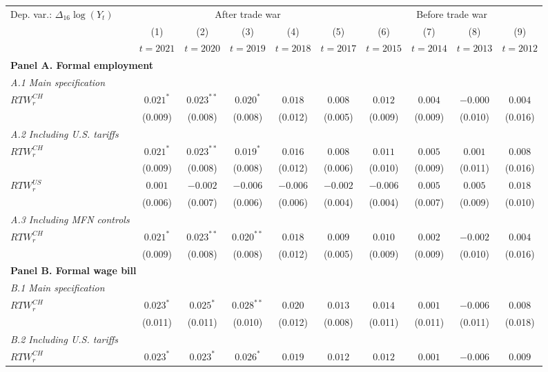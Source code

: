 \begin{tabular}{l*{9}{c}}
\toprule
Dep. var.: $\Delta_{16}\log(Y_t)$ & \multicolumn{5}{c}{After trade war} & \multicolumn{4}{c}{Before trade war} \\
\cmidrule(lr){2-6}\cmidrule(lr){7-10}
 & (1) & (2) & (3) & (4) & (5) & (6) & (7) & (8) & (9) \\
 & $t=2021$ & $t=2020$ & $t=2019$ & $t=2018$ & $t=2017$ & $t=2015$ & $t=2014$ & $t=2013$ & $t=2012$ \\
\midrule
\multicolumn{10}{l}{\textbf{Panel A. Formal employment}} \\
\textit{A.1 Main specification} \\
$RTW_r^{CH}$ & $0.021^{*}$ & $0.023^{**}$ & $0.020^{*}$ & $0.018$ & $0.008$ & $0.012$ & $0.004$ & $-0.000$ & $0.004$ \\
 & (0.009) & (0.008) & (0.008) & (0.012) & (0.005) & (0.009) & (0.009) & (0.010) & (0.016) \\[2pt]
\textit{A.2 Including U.S. tariffs} \\
$RTW_r^{CH}$ & $0.021^{*}$ & $0.023^{**}$ & $0.019^{*}$ & $0.016$ & $0.008$ & $0.011$ & $0.005$ & $0.001$ & $0.008$ \\
 & (0.009) & (0.008) & (0.008) & (0.012) & (0.006) & (0.010) & (0.009) & (0.011) & (0.016) \\[2pt]
$RTW_r^{US}$ & $0.001$ & $-0.002$ & $-0.006$ & $-0.006$ & $-0.002$ & $-0.006$ & $0.005$ & $0.005$ & $0.018$ \\
 & (0.006) & (0.007) & (0.006) & (0.006) & (0.004) & (0.004) & (0.007) & (0.009) & (0.010) \\[2pt]
\textit{A.3 Including MFN controls} \\
$RTW_r^{CH}$ & $0.021^{*}$ & $0.023^{**}$ & $0.020^{**}$ & $0.018$ & $0.009$ & $0.010$ & $0.002$ & $-0.002$ & $0.004$ \\
 & (0.009) & (0.008) & (0.008) & (0.012) & (0.005) & (0.009) & (0.009) & (0.010) & (0.016) \\[2pt]
\midrule
\multicolumn{10}{l}{\textbf{Panel B. Formal wage bill}} \\
\textit{B.1 Main specification} \\
$RTW_r^{CH}$ & $0.023^{*}$ & $0.025^{*}$ & $0.028^{**}$ & $0.020$ & $0.013$ & $0.014$ & $0.001$ & $-0.006$ & $0.008$ \\
 & (0.011) & (0.011) & (0.010) & (0.012) & (0.008) & (0.011) & (0.011) & (0.011) & (0.018) \\[2pt]
\textit{B.2 Including U.S. tariffs} \\
$RTW_r^{CH}$ & $0.023^{*}$ & $0.023^{*}$ & $0.026^{*}$ & $0.019$ & $0.012$ & $0.012$ & $0.001$ & $-0.006$ & $0.009$ \\

\end{tabular}
